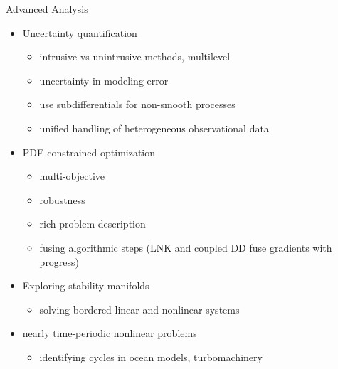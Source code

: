\documentclass{beamer}
\begin{document}
\begin{frame}{Advanced Analysis}
  \begin{itemize}
  \item Uncertainty quantification
    \begin{itemize}
    \item intrusive vs unintrusive methods, multilevel
    \item uncertainty in modeling error
    \item use subdifferentials for non-smooth processes
    \item unified handling of heterogeneous observational data
    \end{itemize}
  \item PDE-constrained optimization
    \begin{itemize}
    \item multi-objective
    \item robustness
    \item rich problem description
    \item fusing algorithmic steps (LNK and coupled DD fuse gradients with progress)
    \end{itemize}
  \item Exploring stability manifolds
    \begin{itemize}
    \item solving bordered linear and nonlinear systems
    \end{itemize}
  \item nearly time-periodic nonlinear problems
    \begin{itemize}
    \item identifying cycles in ocean models, turbomachinery
    \end{itemize}
  \end{itemize}
\end{frame}
\end{document}
